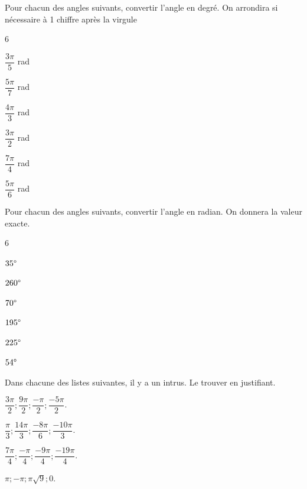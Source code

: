 \documentclass[11pt,a4paper]{article}  %
\begin{document}

Pour chacun des angles suivants, convertir l'angle en degré. On arrondira si nécessaire à 1 chiffre après la virgule
\begin{multicols}{6}
	\begin{enumMet}
		\item $\dfrac{3\pi}{5}$ rad
		\item $\dfrac{5\pi}{7}$ rad
		\item $\dfrac{4\pi}{3}$ rad
		\item $\dfrac{3\pi}{2}$ rad
		\item $\dfrac{7\pi}{4}$ rad
		\item $\dfrac{5\pi}{6}$ rad
	\end{enumMet}
\end{multicols}


Pour chacun des angles suivants, convertir l'angle en radian. On donnera la valeur exacte.
\begin{multicols}{6}
	\begin{enumMet}
		\item $35\degree$
		\item $260\degree$
		\item $70\degree$
		\item $195\degree$
		\item $225\degree$
		\item $54\degree$
	\end{enumMet}
\end{multicols}

\exercice{}

Dans chacune des listes suivantes, il y a un intrus. Le trouver en justifiant.
\begin{enumMet}
	\item $\dfrac{3 \pi}{2} ; \dfrac{9 \pi}{2} ; \dfrac{-\pi}{2} ; \dfrac{-5 \pi}{2}$.
	\item $\dfrac{\pi}{3} ; \dfrac{14 \pi}{3} ; \dfrac{-8 \pi}{6} ; \dfrac{-10 \pi}{3}$.
	\item $\dfrac{7 \pi}{4} ; \dfrac{-\pi}{4} ; \dfrac{-9 \pi}{4} ; \dfrac{-19 \pi}{4}$.
	\item $\pi ;-\pi ; \pi \sqrt{9} ; 0$.
\end{enumMet}

\end{document}
